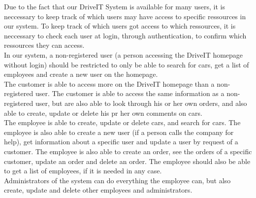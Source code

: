 Due to the fact that our DriveIT System is available for many users, it is neccessary to keep track of which users may have access to specific ressources in our system. To keep track of which users got access to which ressources, it is neccessary to check each user at login, through authentication, to confirm which ressources they can access.\\

In our system, a non-registered user (a person accessing the DriveIT homepage without login) should be restricted to only be able to search for cars, get a list of employees and create a new user on the homepage.\\

The customer is able to access more on the DriveIT homepage than a non-registered user. The customer is able to access the same information as a non-registered user, but are also able to look through his or her own orders, and also able to create, update or delete his pr her own comments on cars.\\

The employee is able to create, update or delete cars, and search for cars. The employee is also able to create a new user (if a person calls the company for help), get information about a specific user and update a user by request of a customer. The employee is also able to create an order, see the orders of a specific customer, update an order and delete an order. The employee should also be able to get a list of employees, if it is needed in any case.\\

Administrators of the system can do everything the employee can, but also create, update and delete other employees and administrators.